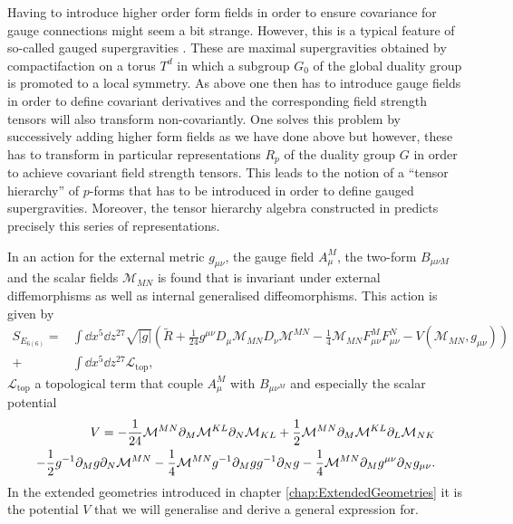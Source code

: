 Having to introduce higher order form fields in order to ensure covariance for gauge connections might seem a bit strange. However, this is a typical feature of so-called gauged supergravities \cite{deWitTensorHierarchies2008}. These are maximal supergravities obtained by compactifaction on a torus $T^d$ in which a subgroup $G_0$ of the global duality group is promoted to a local symmetry. As above one then has to introduce gauge fields in order to define covariant derivatives and the corresponding field strength tensors will also transform non-covariantly. One solves this problem by successively adding higher form fields as we have done above but however, these has to transform in particular representations $R_p$ of the duality group $G$ in order to achieve covariant field strength tensors. This leads to the notion of a ``tensor hierarchy'' of $p$-forms that has to be introduced in order to define gauged supergravities. Moreover, the tensor hierarchy algebra constructed in \cite{Palmkvist:2013vya} predicts precisely this series of representations.

In \cite{E62014} an action for the external metric $g_{\mu\nu}$, the gauge field $A^M_\mu$, the two-form $B_{\mu\nu M}$ and the scalar fields $\mathcal{M}_{MN}$ is found that is invariant under external diffemorphisms as well as internal generalised diffeomorphisms. This action is given by 
\begin{equation}\label{eq:E6Action}\begin{aligned}
    S_{E_{6(6)}} = &\int \dd x^5\dd z^{27} \sqrt{|g|}\left(\tilde{R}+\frac{1}{24}g^{\mu\nu}D_\mu \mathcal{M}_{MN}D_\nu\mathcal{M}^{MN}-\frac{1}{4}\mathcal{M}_{MN}F^M_{\mu\nu}F^N_{\mu\nu}-V(\mathcal{M}_{MN},g_{\mu\nu})\right)\\
    +&\int \dd x^5\dd z^{27}\mathcal{L}_{\text{top}},
    \end{aligned}
\end{equation}
$\mathcal{L}_{\text{top}}$ a topological term that couple $A_\mu^M$ with $B_{\mu\nu^M}$ and especially the scalar potential 
\begin{equation}
    \begin{aligned}
    V = -\frac{1}{24}\mathcal{M}^{MN}\partial_M\mathcal{M}^{KL}\partial_N\mathcal{M}_{KL}+\frac{1}{2}\mathcal{M}^{MN}\partial_M\mathcal{M}^{KL}\partial_L\mathcal{M}_{NK}\\
    -\frac{1}{2}g^{-1}\partial_M g\partial_N\mathcal{M}^{MN}-\frac{1}{4}\mathcal{M}^{MN}g^{-1}\partial_Mgg^{-1}\partial_Ng-\frac{1}{4}\mathcal{M}^{MN}\partial_Mg^{\mu\nu}\partial_Ng_{\mu\nu}. 
    \end{aligned}
\end{equation}
In the extended geometries introduced in chapter \ref{chap:ExtendedGeometries} it is the potential $V$ that we will generalise and derive a general expression for. 



